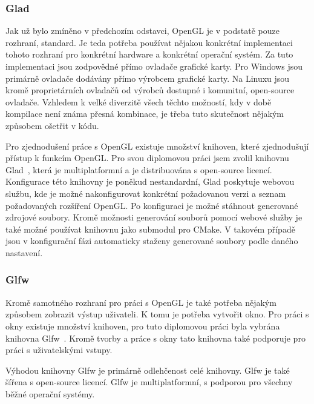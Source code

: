\documentclass[czech,master]{diploma}
\begin{document}
\subsubsection*{Glad}
Jak už bylo zmíněno v předchozím odstavci, OpenGL je v podstatě pouze rozhraní, standard. Je teda potřeba používat nějakou konkrétní implementaci tohoto rozhraní pro konkrétní hardware a konkrétní operační systém. Za tuto implementaci jsou zodpovědné přímo ovladače grafické karty. Pro Windows jsou primárně ovladače dodávány přímo výrobcem grafické karty. Na Linuxu jsou kromě proprietárních ovladačů od výrobců dostupné i komunitní, open-source ovladače. Vzhledem k velké diverzitě všech těchto možností, kdy v době kompilace není známa přesná kombinace, je třeba tuto skutečnost nějakým způsobem ošetřit v kódu.\par
Pro zjednodušení práce s OpenGL existuje množství knihoven, které zjednodušují přístup k funkcím OpenGL\@. Pro svou diplomovou práci jsem zvolil knihovnu Glad~\cite{sourceGlad}, která je multiplatformní a je distribuována s open-source licencí. Konfigurace této knihovny je poněkud nestandardní, Glad poskytuje webovou službu, kde je možné nakonfigurovat konkrétní požadovanou verzi a seznam požadovaných rozšíření OpenGL\@. Po konfiguraci je možné stáhnout generované zdrojové soubory. Kromě možnosti generování souborů pomocí webové služby je také možné používat knihovnu jako submodul pro CMake. V takovém případě jsou v konfigurační fázi automaticky staženy generované soubory podle daného nastavení.

\subsubsection*{Glfw}
Kromě samotného rozhraní pro práci s OpenGL je také potřeba nějakým způsobem zobrazit výstup uživateli. K tomu je potřeba vytvořit okno. Pro práci s okny existuje množství knihoven, pro tuto diplomovou práci byla vybrána knihovna Glfw~\cite{sourceGLFW}. Kromě tvorby a práce s okny tato knihovna také podporuje pro práci s uživatelskými vstupy.\par
Výhodou knihovny Glfw je primárně odlehčenost celé knihovny. Glfw je také šířena s open-source licencí. Glfw je multiplatformní, s podporou pro všechny běžné operační systémy.
\end{document}
